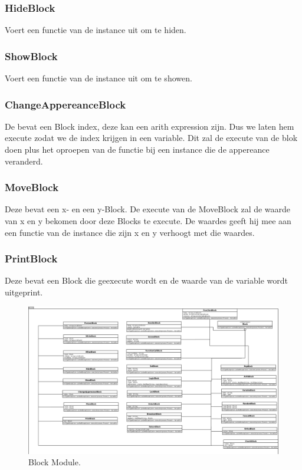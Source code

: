 \documentclass[]{article}
\begin{document}
\subsubsection{HideBlock}
Voert een functie van de instance uit om te hiden.
\subsubsection{ShowBlock}
Voert een functie van de instance uit om te showen.
\subsubsection{ChangeAppereanceBlock}
De bevat een Block index, deze kan een arith expression zijn. Dus we laten hem execute zodat we de index krijgen in een variable. Dit zal de execute van de blok doen plus het oproepen van de functie bij een instance die de appereance veranderd.
\subsubsection{MoveBlock}
Deze bevat een x- en een y-Block. De execute van de MoveBlock zal de waarde van x en y bekomen door deze Blocks te execute. De waardes geeft hij mee aan een functie van de instance die zijn x en y verhoogt met die waardes.
\subsubsection{PrintBlock}
Deze bevat een Block die geexecute wordt en de waarde van de variable wordt uitgeprint.


\clearpage
 \begin{figure}
  \centering
   
\includegraphics[scale=0.8]{./AnalyseClassenDiagram/block.png}
  \caption{Block Module.} \label{blockUML}
\end{figure}
\clearpage
\end{document}
